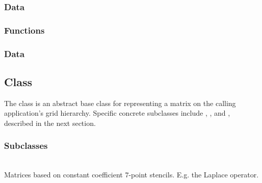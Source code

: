 \documentclass[11pt]{article}
\begin{document}
\subsubsection{ Data}

\subsubsection{ Functions}

\subsubsection{ Data}

\subsection{ Class} \label{ss:matrix}

   The  class is an abstract base class for representing
   a matrix on the calling application's grid hierarchy.  Specific
   concrete subclasses include , , and
   , described in the next section.

   \umlMatrix

\subsubsection{ Subclasses}

     \\
      Matrices based on constant coefficient $7$-point stencils.
      E.g. the Laplace operator.
\end{document}
